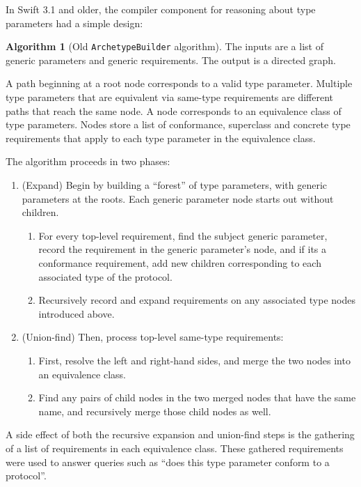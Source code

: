 \documentclass[headsepline,bibliography=totoc]{scrreport}
\theoremstyle{definition}
\theoremstyle{definition}
\theoremstyle{definition}
\newtheorem{algorithm}{Algorithm}[chapter]
\begin{document}
In Swift 3.1 and older, the compiler component for reasoning about type parameters had a simple design:
\begin{algorithm}[Old \texttt{ArchetypeBuilder} algorithm]\label{archetypebuilder} The inputs are a list of generic parameters and generic requirements. The output is a directed graph.

A path beginning at a root node corresponds to a valid type parameter. Multiple type parameters that are equivalent via same-type requirements are different paths that reach the same node. A node corresponds to an equivalence class of type parameters. Nodes store a list of conformance, superclass and concrete type requirements that apply to each type parameter in the equivalence class.

The algorithm proceeds in two phases:
\begin{enumerate}
\item (Expand) Begin by building a ``forest'' of type parameters, with generic parameters at the roots. Each generic parameter node starts out without children.
\begin{enumerate}
\item For every top-level requirement, find the subject generic parameter, record the requirement in the generic parameter's node, and if its a conformance requirement, add new children corresponding to each associated type of the protocol.
\item Recursively record and expand requirements on any associated type nodes introduced above.
\end{enumerate}
\item (Union-find) Then, process top-level same-type requirements:
\begin{enumerate}
\item First, resolve the left and right-hand sides, and merge the two nodes into an equivalence class.
\item Find any pairs of child nodes in the two merged nodes that have the same name, and recursively merge those child nodes as well.
\end{enumerate}
\end{enumerate}
\end{algorithm}


A side effect of both the recursive expansion and union-find steps is the gathering of a list of requirements in each equivalence class. These gathered requirements were used to answer queries such as ``does this type parameter conform to a protocol''.
\end{document}
